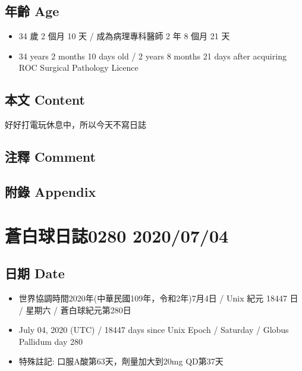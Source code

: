\documentclass[a5paper, 11pt
]{book}
\providecommand{\tightlist}{%
  \setlength{\itemsep}{0pt}\setlength{\parskip}{0pt}}
\begin{document}
\hypertarget{ux5e74ux9f61-age-32}{%
\subsection{年齡 Age}\label{ux5e74ux9f61-age-32}}

\begin{itemize}
\tightlist
\item
  34 歲 2 個月 10 天 / 成為病理專科醫師 2 年 8 個月 21 天
\item
  34 years 2 months 10 days old / 2 years 8 months 21 days after
  acquiring ROC Surgical Pathology Licence
\end{itemize}

\hypertarget{ux672cux6587-content-32}{%
\subsection{本文 Content}\label{ux672cux6587-content-32}}

好好打電玩休息中，所以今天不寫日誌

\hypertarget{ux6ce8ux91cb-comment-32}{%
\subsection{注釋 Comment}\label{ux6ce8ux91cb-comment-32}}

\hypertarget{ux9644ux9304-appendix-32}{%
\subsection{附錄 Appendix}\label{ux9644ux9304-appendix-32}}

\hypertarget{ux84bcux767dux7403ux65e5ux8a8c0280-20200704}{%
\section{蒼白球日誌0280
2020/07/04}\label{ux84bcux767dux7403ux65e5ux8a8c0280-20200704}}

\hypertarget{ux65e5ux671f-date-33}{%
\subsection{日期 Date}\label{ux65e5ux671f-date-33}}

\begin{itemize}
\tightlist
\item
  世界協調時間2020年(中華民國109年，令和2年)7月4日 / Unix 紀元 18447 日
  / 星期六 / 蒼白球紀元第280日
\item
  July 04, 2020 (UTC) / 18447 days since Unix Epoch / Saturday / Globus
  Pallidum day 280
\item
  特殊註記: 口服A酸第63天，劑量加大到20mg QD第37天
\end{itemize}
\end{document}
